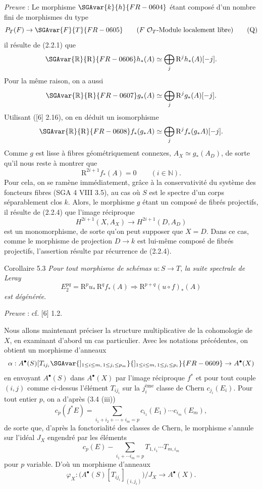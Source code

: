 \emph{Preuve} : Le morphisme $\SGAvar{k}{h}{FR-0604}$ étant composé d'un nombre fini de morphismes du type
\[
P_T(F)\to \SGAvar{F}{T}{FR-0605}\qquad (F\text{ }\mathcal{O}_T\text{-Module localement libre})
\tag{Q}
\]
il résulte de (2.2.1) que
\[
\SGAvar{\mathbb{R}}{\mathrm{R}}{FR-0606} h_*(A)\simeq\bigoplus_j \mathrm{R}^jh_*(A)[-j].
\]
Pour la même raison, on a aussi
\[
\SGAvar{\mathbb{R}}{\mathrm{R}}{FR-0607} g_*(A)\simeq\bigoplus_j \mathrm{R}^jg_*(A)[-j].
\]
Utilisant ([6] 2.16), on en déduit un isomorphisme
\[
\SGAvar{\mathbb{R}}{\mathrm{R}}{FR-0608} f_*(g_*A)\simeq\bigoplus_j \mathrm{R}^j f_*(g_*A)[-j].
\]
Comme $g$ est lisse à fibres géométriquement connexes, $A_X\simeq g_*(A_D)$, de sorte qu'il nous reste à montrer que
\[
\mathrm{R}^{2i+1}f_*(A)=0\qquad (i\in\mathbb{N}).
\tag{5.2.1}
\]
Pour cela, on se ramène immédiatement, grâce à la conservativité du système des foncteurs fibres (SGA 4 VIII 3.5), au cas où $S$ est le spectre d'un corps séparablement clos $k$. Alors, le morphisme $g$ étant un composé de fibrés projectifs, il résulte de (2.2.4) que l'image réciproque
\[
H^{2i+1}(X,A_X)\to H^{2i+1}(D,A_D)
\]
est un monomorphisme, de sorte qu'on peut supposer que $X=D$. Dans ce cas, comme le
morphisme de projection $D\to k$ est lui-même composé de fibrés projectifs, l'assertion résulte par récurrence de (2.2.4).

\begin{statement}{Corollaire 5.3}
\emph{Pour tout morphisme de schémas} $u:S\to T$, \emph{la suite spectrale de Leray}
\[
E_2^{pq}=\mathrm{R}^p u_*\,\mathrm{R}^q f_*(A)\Rightarrow \mathrm{R}^{p+q}(u\circ f)_*(A)
\]
\emph{est dégénérée}.
\end{statement}

\emph{Preuve} : cf. [6] 1.2.

Nous allons maintenant préciser la structure multiplicative de la cohomologie de $X$, en examinant d'abord un cas particulier. Avec les notations précédentes, on obtient un morphisme d'anneaux
\[
\alpha:A^{\bullet}(S)[T_{ij_i}\SGAvar{]_{1\le i\le m,\,1\le j_i\le p_m}}{]_{1\le i\le m,\,1\le j_i\le p_i}}{FR-0609}\to A^{\bullet}(X)
\]
en envoyant $A^{\bullet}(S)$ dans $A^{\bullet}(X)$ par l'image réciproque $f^*$ et pour tout couple $(i,j)$ comme ci-dessus l'élément $T_{ij_i}$ sur la $j_i^{\text{ème}}$ classe de Chern $c_{j_i}(E_i)$. Pour tout entier $p$, on a d'après (3.4 (iii))
\[
c_p(f^*E)=\sum_{i_1+i_2+\cdots+i_m=p}c_{i_1}(E_1)\cdots c_{i_m}(E_m),
\]
de sorte que, d'après la fonctorialité des classes de Chern, le morphisme s'annule sur l'idéal $J_X$ engendré par les éléments
\[
c_p(E)-\sum_{i_1+\cdots i_m=p}T_{1,i_1}\cdots T_{m,i_m}
\]
pour $p$ variable. D'où un morphisme d'anneaux
\[
\varphi_X:\bigl(A^{\bullet}(S)[T_{ij_i}]_{(i,j_i)}\bigr)/J_X\to A^{\bullet}(X).
\]

